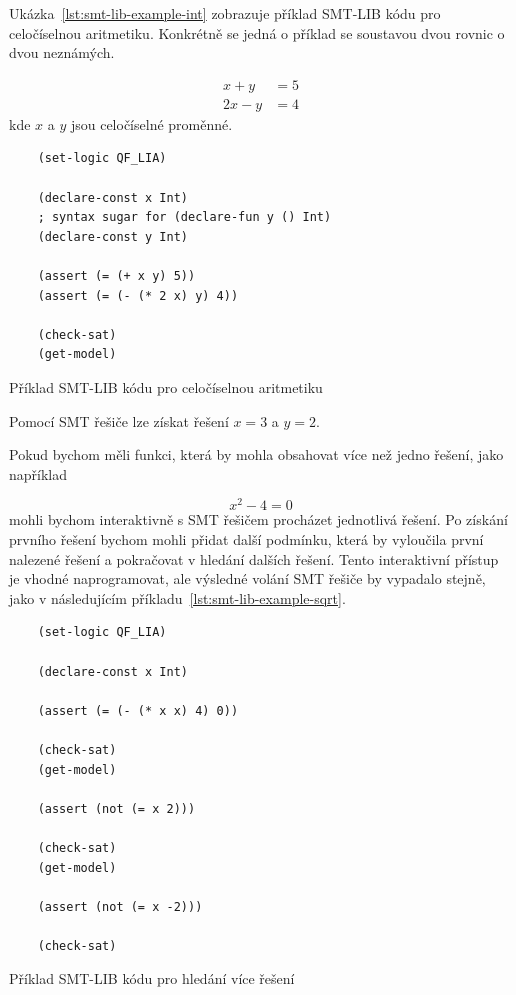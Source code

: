 Ukázka~\ref{lst:smt-lib-example-int} zobrazuje příklad SMT-LIB kódu pro celočíselnou aritmetiku.
Konkrétně se jedná o příklad se soustavou dvou rovnic o dvou neznámých.

\begin{align*}
    x + y &= 5 \\
    2x − y &= 4
\end{align*}
kde $x$ a $y$ jsou celočíselné proměnné.

\begin{listing}[H]
    \begin{verbatim}
    (set-logic QF_LIA)

    (declare-const x Int)
    ; syntax sugar for (declare-fun y () Int)
    (declare-const y Int)

    (assert (= (+ x y) 5))
    (assert (= (- (* 2 x) y) 4))

    (check-sat)
    (get-model)
    \end{verbatim}
    \caption{Příklad SMT-LIB kódu pro celočíselnou aritmetiku}
    \label{lst:smt-lib-example-int}
\end{listing}

Pomocí SMT řešiče lze získat řešení $x = 3$ a $y = 2$.

Pokud bychom měli funkci, která by mohla obsahovat více než jedno řešení,
jako například

\begin{equation*}
    x^2 - 4 = 0
\end{equation*}
mohli bychom interaktivně s SMT řešičem procházet jednotlivá řešení.
Po získání prvního řešení bychom mohli přidat další podmínku, která by vyloučila
první nalezené řešení a pokračovat v hledání dalších řešení.
Tento interaktivní přístup je vhodné naprogramovat, ale výsledné volání SMT řešiče
by vypadalo stejně, jako v následujícím příkladu~\ref{lst:smt-lib-example-sqrt}.

\begin{listing}[H]
    \begin{verbatim}
    (set-logic QF_LIA)

    (declare-const x Int)

    (assert (= (- (* x x) 4) 0))

    (check-sat)
    (get-model)

    (assert (not (= x 2)))

    (check-sat)
    (get-model)

    (assert (not (= x -2)))

    (check-sat)
    \end{verbatim}
    \caption{Příklad SMT-LIB kódu pro hledání více řešení}
    \label{lst:smt-lib-example-sqrt}
\end{listing}


